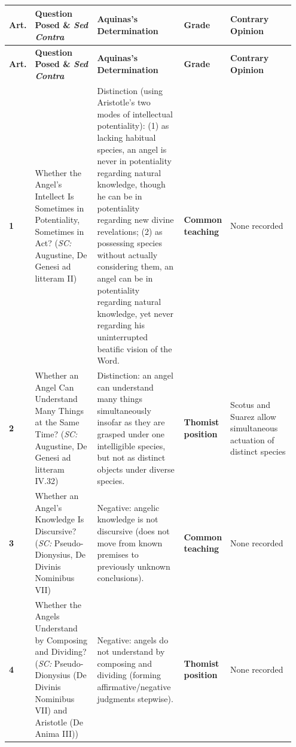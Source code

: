 {\scriptsize
\setlength{\tabcolsep}{2.5pt}
\renewcommand{\arraystretch}{1.15}
\begin{longtable}{>{\raggedright\arraybackslash}p{0.05\linewidth}>{\raggedright\arraybackslash}p{0.23\linewidth}>{\raggedright\arraybackslash}p{0.31\linewidth}>{\raggedright\arraybackslash}p{0.12\linewidth}>{\raggedright\arraybackslash}p{0.24\linewidth}}
\toprule
\textbf{Art.} & \textbf{Question Posed \& \emph{Sed Contra}} & \textbf{Aquinas's Determination} & \textbf{Grade} & \textbf{Contrary Opinion} \\
\midrule
\endfirsthead
\toprule
\textbf{Art.} & \textbf{Question Posed \& \emph{Sed Contra}} & \textbf{Aquinas's Determination} & \textbf{Grade} & \textbf{Contrary Opinion} \\
\midrule
\endhead
\bottomrule
\endfoot
\textbf{1} & Whether the Angel's Intellect Is Sometimes in Potentiality, Sometimes in Act? (\emph{SC:} Augustine, De Genesi ad litteram II) & Distinction (using Aristotle's two modes of intellectual potentiality): (1) as lacking habitual species, an angel is never in potentiality regarding natural knowledge, though he can be in potentiality regarding new divine revelations; (2) as possessing species without actually considering them, an angel can be in potentiality regarding natural knowledge, yet never regarding his uninterrupted beatific vision of the Word. & \textbf{Common teaching} & None recorded \\
\addlinespace[1.5pt]
\textbf{2} & Whether an Angel Can Understand Many Things at the Same Time? (\emph{SC:} Augustine, De Genesi ad litteram IV.32) & Distinction: an angel can understand many things simultaneously insofar as they are grasped under one intelligible species, but not as distinct objects under diverse species. & \textbf{Thomist position} & Scotus and Suarez allow simultaneous actuation of distinct species \\
\addlinespace[1.5pt]
\textbf{3} & Whether an Angel's Knowledge Is Discursive? (\emph{SC:} Pseudo-Dionysius, De Divinis Nominibus VII) & Negative: angelic knowledge is not discursive (does not move from known premises to previously unknown conclusions). & \textbf{Common teaching} & None recorded \\
\addlinespace[1.5pt]
\textbf{4} & Whether the Angels Understand by Composing and Dividing? (\emph{SC:} Pseudo-Dionysius (De Divinis Nominibus VII) and Aristotle (De Anima III)) & Negative: angels do not understand by composing and dividing (forming affirmative/negative judgments stepwise). & \textbf{Thomist position} & None recorded \\

\end{longtable}}
